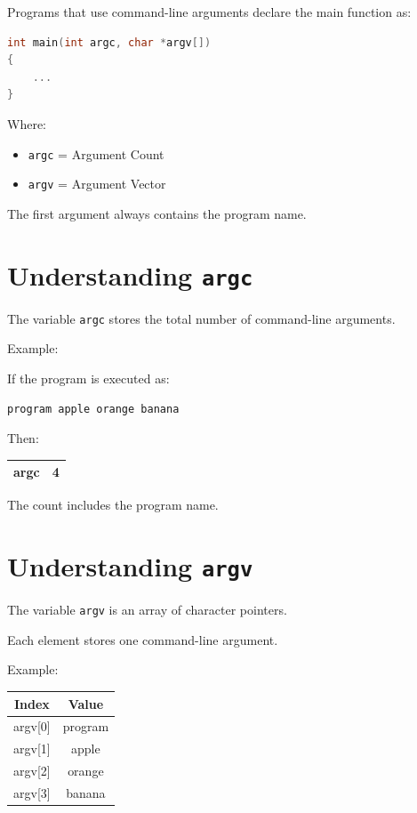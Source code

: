 \documentclass[12pt,openany]{book}
\begin{document}
Programs that use command-line arguments declare the main function as:

\begin{lstlisting}[language=C]
int main(int argc, char *argv[])
{
    ...
}
\end{lstlisting}

Where:

\begin{itemize}
    \item \texttt{argc} = Argument Count
    \item \texttt{argv} = Argument Vector
\end{itemize}

The first argument always contains the program name.
\section{Understanding \texttt{argc}}

The variable \texttt{argc} stores the total number of command-line arguments.

Example:

If the program is executed as:

\begin{lstlisting}
program apple orange banana
\end{lstlisting}

Then:

\begin{center}
\begin{tabular}{|c|c|}
\hline
argc & 4 \\
\hline
\end{tabular}
\end{center}

The count includes the program name.

\section{Understanding \texttt{argv}}

The variable \texttt{argv} is an array of character pointers.

Each element stores one command-line argument.

Example:

\begin{center}
\begin{tabular}{|c|c|}
\hline
Index & Value \\
\hline
argv[0] & program \\
argv[1] & apple \\
argv[2] & orange \\
argv[3] & banana \\
\hline
\end{tabular}
\end{center}
\end{document}
